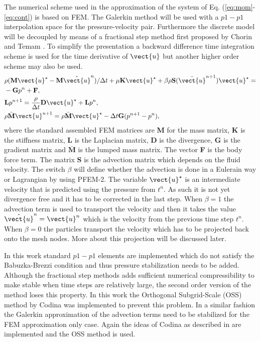 The numerical scheme used in the approximation of the system of Eq. (\ref{eq:mom}-\ref{eq:cont}) is based on FEM. The Galerkin method will be used with a $p1-p1$ interpolation space for the pressure-velocity pair. Furthermore the discrete model will be decoupled by means of a fractional step method first proposed by Chorin \cite{chorin} and Temam \cite{temam}. To simplify the presentation a backward difference time integration scheme is used for the time derivative of $\vect{u}$ but another higher order scheme may also be used. 
%
\begin{align}\label{eq:masamat}
&\rho (\textbf{M}\vect{u}^\star-\textbf{M}\hat{\vect{u}}^n)/\Delta t+\mu\textbf{K}\vect{u}^{\star} +\beta\rho\textbf{S}(\bar{\vect{u}}^{n+1})\vect{u}^{\star}  = \nonumber\\&-\textbf{G}p^n+ \textbf{F},
\\\label{eq:matpres2}
& \textbf{L}p^{n+1}=\frac{\rho}{\Delta t}\textbf{D}\vect{u}^\star+ \textbf{L}  p^{n},
\\\label{eq:matunm2}
&\rho \bar{\textbf{M}}\vect{u}^{n+1}=\rho \bar{\textbf{M}}\vect{u}^\star-\Delta t\textbf{G}(p^{n+1}- p^n),
\end{align}
%
where the standard assembled FEM matrices are \textbf{M} for the mass matrix, \textbf{K} is the stiffness matrix, \textbf{L} is the Laplacian matrix, \textbf{D} is the divergence, \textbf{G} is the gradient matrix and $\bar{\textbf{M}}$ is the lumped mass matrix. The vector \textbf{F} is the body force term. The matrix \textbf{S} is the advection matrix which depends on the fluid velocity. The switch $\beta$ will define whether the advection is done in a Eulerain way or Lagrangian by using PFEM-2. The variable $\vect{u}^\star$ is an intermediate velocity that is predicted using the pressure from $t^n$. As such it is not yet divergence free and it has to be corrected in the last step. When $\beta=1$ the advection term is used to transport the velocity and then it takes the value  $\hat{\vect{u}}^n=\vect{u}^n$ which is the velocity from the previous time step $t^n$. When $\beta=0$ the particles transport the velocity which has to be projected back onto the mesh nodes. More about this projection will be discussed later.

In this work standard $p1-p1$ elements are implemented which do not satisfy the Babuzka-Brezzi condition and thus pressure stabilization needs to be added. Although the fractional step methods adds sufficient numerical compressibility to make stable when time steps are relatively large, the second order version of the method loses this property. In this work the Orthogonal Subgrid-Scale (OSS) method by Codina \cite{codina-oss-press} was implemented to prevent this problem. In a similar fashion the Galerkin approximation of the advection terms need to be stabilized for the FEM approximation only case. Again the ideas of Codina as described in \cite{codina-soto} are implemented and the OSS method is used. 
